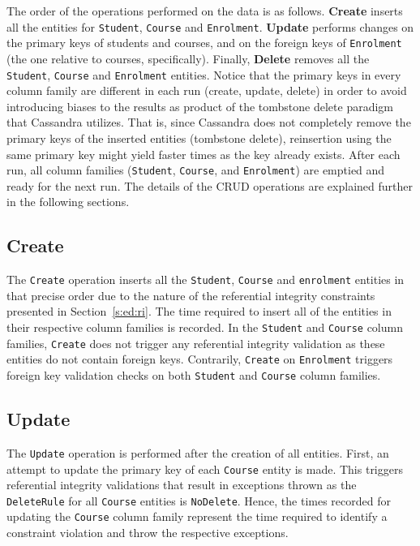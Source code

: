 		
The order of the operations performed on the data is as follows.  \textbf{Create}
inserts all the entities for \texttt{Student},  \texttt{Course} and
\texttt{Enrolment}.  \textbf{Update} performs changes on the primary keys of
students and courses,  and on the foreign keys of \texttt{Enrolment} (the one
relative to courses,  specifically).  Finally,  \textbf{Delete} removes all the
\texttt{Student},  \texttt{Course} and \texttt{Enrolment} entities. 
Notice that the primary keys in every column family are different in each run
(create,  update,  delete) in order to avoid introducing biases to the results as
product of the tombstone delete paradigm that Cassandra utilizes.  That is,  since
Cassandra does not completely  remove the primary keys of the inserted entities
(tombstone delete),  reinsertion  using the same primary key might yield faster
times as the key already exists.  After each run,  all column families
(\texttt{Student},  \texttt{Course},  and \texttt{Enrolment}) are emptied and
ready for the next run.   The details  of the \ac{CRUD} operations are explained
further in the following sections. 
		

	
\subsection{Create} The \texttt{Create} operation inserts all the
\texttt{Student},  \texttt{Course} and \texttt{enrolment} entities in that
precise order due to the nature of the referential integrity constraints
presented in Section~\ref{s:ed:ri}.  The time required to insert all of the
entities in their respective column families  is recorded.  In the
\texttt{Student} and \texttt{Course} column families,  \texttt{Create} does not
trigger any referential integrity validation as these entities do not contain
foreign keys. 
Contrarily,  \texttt{Create} on \texttt{Enrolment} triggers foreign key
validation checks on both \texttt{Student} and \texttt{Course} column families. 
		
\subsection{Update} The \texttt{Update} operation is performed after the
creation of all entities. 
First,  an attempt to update the primary key of each \texttt{Course} entity is
made.  This triggers referential integrity validations that result in exceptions
thrown as the \texttt{DeleteRule} for all \texttt{Course} entities is
\texttt{NoDelete}.  Hence,  the times recorded for updating the \texttt{Course}
column family represent the time required to identify a constraint violation and throw
the respective exceptions. 
					
